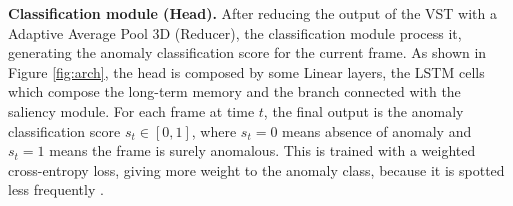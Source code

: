 \noindent\textbf{Classification module (Head).}
After reducing the output of the VST with a Adaptive Average Pool 3D (Reducer), the classification module process it, generating the anomaly classification score for the current frame.
As shown in Figure \ref{fig:arch}, the head is composed by some Linear layers, the LSTM cells which compose the long-term memory and the branch connected with the saliency module.
For each frame at time $t$, the final output is the anomaly classification score $s_t \in [0,1]$, where $s_t=0$ means absence of anomaly and $s_t=1$ means the frame is surely anomalous.
This is trained with a weighted cross-entropy loss, giving more weight to the anomaly class, because it is spotted less frequently  .


